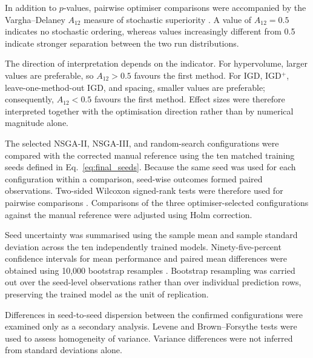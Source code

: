 \documentclass[a4paper,fleqn]{cas-sc}
\begin{document}
In addition to $p$-values, pairwise optimiser comparisons were accompanied by the Vargha--Delaney $A_{12}$ measure of stochastic superiority \cite{vargha2000critique}. A value of $A_{12}=0.5$ indicates no stochastic ordering, whereas values increasingly different from 0.5 indicate stronger separation between the two run distributions.

The direction of interpretation depends on the indicator. For hypervolume, larger values are preferable, so $A_{12}>0.5$ favours the first method. For IGD, IGD$^{+}$, leave-one-method-out IGD, and spacing, smaller values are preferable; consequently, $A_{12}<0.5$ favours the first method. Effect sizes were therefore interpreted together with the optimisation direction rather than by numerical magnitude alone.


The selected NSGA-II, NSGA-III, and random-search configurations were compared with the corrected manual reference using the ten matched training seeds defined in Eq.~\eqref{eq:final_seeds}. Because the same seed was used for each configuration within a comparison, seed-wise outcomes formed paired observations. Two-sided Wilcoxon signed-rank tests were therefore used for pairwise comparisons \cite{wilcoxon1945ranking}. Comparisons of the three optimiser-selected configurations against the manual reference were adjusted using Holm correction.

Seed uncertainty was summarised using the sample mean and sample standard deviation across the ten independently trained models. Ninety-five-percent confidence intervals for mean performance and paired mean differences were obtained using 10,000 bootstrap resamples \cite{efron1993bootstrap}. Bootstrap resampling was carried out over the seed-level observations rather than over individual prediction rows, preserving the trained model as the unit of replication.

Differences in seed-to-seed dispersion between the confirmed configurations were examined only as a secondary analysis. Levene and Brown--Forsythe tests were used to assess homogeneity of variance. Variance differences were not inferred from standard deviations alone.

\end{document}
